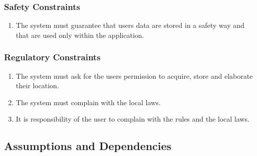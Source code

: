 \subsubsection{Safety Constraints}
\begin{enumerate}
\item
The system must guarantee that users data are stored in a safety way and that are used only within the application.
\end{enumerate}

\subsubsection{Regulatory Constraints}
\begin{enumerate}
\item
The system must ask for the users permission to acquire, store and elaborate their location.
\item
The system must complain with the local laws.
\item
It is responsibility of the user to complain with the rules and the local laws.
\end{enumerate}

\subsection{Assumptions and Dependencies}
